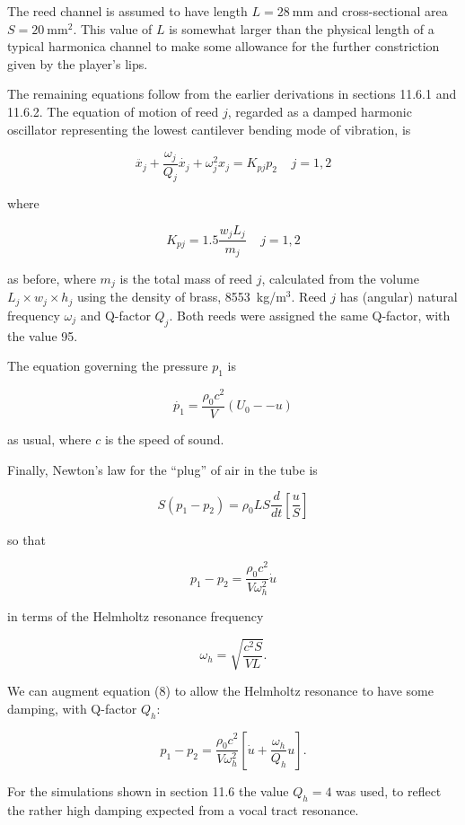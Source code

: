   The reed channel is assumed to have length $L=28 \mathrm{~mm}$ and 
  cross-sectional area $S=20 \mathrm{~mm}^2$. This value of $L$ is somewhat 
  larger than the physical length of a typical harmonica channel to make some 
  allowance for the further constriction given by the player's lips. 

  The remaining equations follow from the earlier derivations in sections 
  11.6.1 and 11.6.2. The equation of motion of reed $j$, regarded as a damped 
  harmonic oscillator representing the lowest cantilever bending mode of 
  vibration, is 

  $$\ddot{x_j}+\dfrac{\omega_j}{Q_j} \dot{x_j} +\omega_j^2 x_j = K_{pj} p_2 
  \mathrm{~~~~~} j=1,2 \tag{4}$$ 

  where 

  $$K_{pj} = 1.5 \dfrac{w_j L_j}{m_j} \mathrm{~~~~~} j=1,2 \tag{5}$$ 

  as before, where $m_j$ is the total mass of reed $j$, calculated from the 
  volume $L_j \times w_j \times h_j$ using the density of brass, 8553~kg/m$^3$. 
  Reed $j$ has (angular) natural frequency $\omega_j$ and Q-factor $Q_j$. Both 
  reeds were assigned the same Q-factor, with the value 95. 

  The equation governing the pressure $p_1$ is 

  $$\dot{p_1}=\dfrac{\rho_0 c^2}{V} (U_0 -- u) \tag{6}$$ 

  as usual, where $c$ is the speed of sound. 

  Finally, Newton's law for the ``plug'' of air in the tube is 

  $$S(p_1-p_2) = \rho_0 L S \dfrac{d}{dt}\left[\dfrac{u}{S}\right] \tag{7}$$ 

  so that 

  $$p_1-p_2=\dfrac{\rho_0 c^2}{V \omega_h^2} \dot{u} \tag{8}$$ 

  in terms of the Helmholtz resonance frequency 

  $$\omega_h=\sqrt{\dfrac{c^2 S}{VL}}. \tag{9}$$ 

  We can augment equation (8) to allow the Helmholtz resonance to have some 
  damping, with Q-factor $Q_h$: 

  $$p_1-p_2=\dfrac{\rho_0 c^2}{V \omega_h^2} \left[\dot{u}+ 
  \dfrac{\omega_h}{Q_h}u \right] . \tag{10}$$ 

  For the simulations shown in section 11.6 the value $Q_h=4$ was used, to 
  reflect the rather high damping expected from a vocal tract resonance. 

